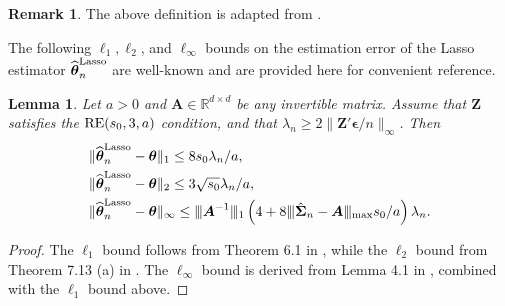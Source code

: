 \documentclass[aos,preprint]{imsart}
\theoremstyle{plain}
\newtheorem{lemma}[theorem]{Lemma}
\theoremstyle{definition}
\newtheorem{remark}{Remark}
\newcommand{\btheta}{\boldsymbol{\theta}}
\newcommand{\bd}[1]{\boldsymbol{#1}}
\newcommand{\hbtheta}{\widehat{\boldsymbol{\theta}}}
\newcommand{\mn}{\vert\kern-0.25ex \vert\kern-0.25ex \vert}
\newcommand{\mR}{\mathbb{R}}
\newcommand{\ltheta}{\hbtheta^{\textup{Lasso}}}
\newcommand{\bA}{\boldsymbol{A}}
\newcommand{\bZ}{\boldsymbol{Z}}
\newcommand{\hbSigma}{\hat{\boldsymbol{\Sigma}}}
\newcommand{\bepsilon}{\bd{\epsilon}}
\begin{document}
\begin{appendix}
\begin{remark} 
The above definition is adapted from \cite[Definition 7.12]{wainwright2009sharp}.
\end{remark}

The following $\ell_1, \ell_2$, and $\ell_{\infty}$ bounds on the estimation error of the Lasso estimator $\ltheta_n$ are well-known and are provided here for convenient reference.

\begin{lemma} \label{lemma: bounds of lasso}
Let $a >0$ and $\bA\in \mR^{d\times d}$ be any invertible matrix. Assume that $\bZ$ satisfies the $\textup{RE}(s_0, 3, a)$ condition, and that 
$\lambda_n \ge 2\|\bZ'\bepsilon/n\|_{\infty}$. Then
\begin{align*}
&\|\ltheta_n-\btheta\|_1\le {8s_0\lambda_n}/{a}, \\
&\|\ltheta_n-\btheta\|_2 \le {3\sqrt{s_0}\lambda_n}/{a},\\
& \|\ltheta_n-\btheta\|_{\infty} \le \mn\bA^{-1}\mn_1 \left(4 + 8\mn\hbSigma_n-\bA\mn_{\textup{max}} s_0/a\right)\lambda_n.
\end{align*}
\end{lemma}

\begin{proof}
The $\ell_1$ bound follows from Theorem 6.1 in \cite{buhlmann2011statistics}, while the $\ell_2$ bound from Theorem 7.13 (a) in \cite{wainwright2019high}. The $\ell_{\infty}$ bound
is derived from Lemma 4.1 in \cite{van2016estimation}, combined with the $\ell_1$ bound above.
\end{proof}

\end{appendix}
\end{document}
